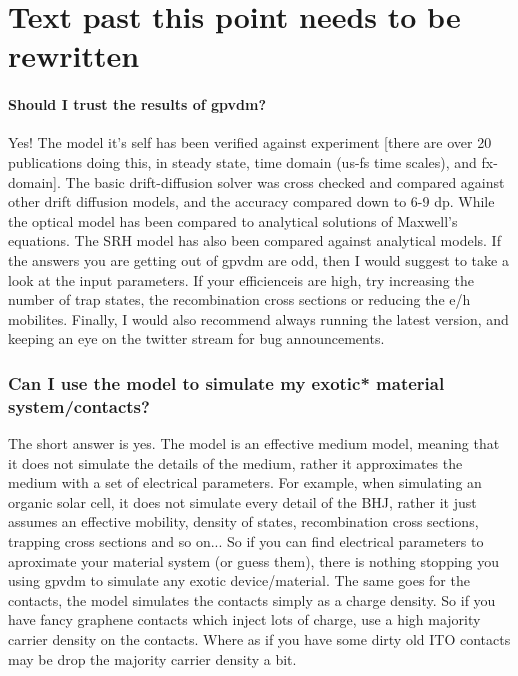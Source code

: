 
\chapter{Text past this point needs to be rewritten}


\subsubsection{Should I trust the results of gpvdm?}
Yes!  The model it's self has been verified against experiment [there are over 20 publications doing this, in steady state, time domain (us-fs time scales), and fx-domain]. The basic drift-diffusion solver was cross checked and compared against other drift diffusion models, and the accuracy compared down to 6-9 dp.  While the optical model has been compared to analytical solutions of Maxwell's equations.  The SRH model has also been compared against analytical models.  If the answers you are getting out of gpvdm are odd, then I would suggest to take a look at the input parameters.  If your efficienceis are high, try increasing the number of trap states, the recombination cross sections or reducing the e/h mobilites.  Finally, I would also recommend always running the latest version, and keeping an eye on the twitter stream for bug announcements.



\subsection{Can I use the model to simulate my exotic* material system/contacts?}
The short answer is yes.  The model is an effective medium model, meaning that it does not simulate the details of the medium, rather it approximates the medium with a set of electrical parameters.  For example, when simulating an organic solar cell, it does not simulate every detail of the BHJ, rather it just assumes an effective mobility, density of states, recombination cross sections, trapping cross sections and so on...  So if you can find electrical parameters to aproximate your material system (or guess them), there is nothing stopping you using gpvdm to simulate any exotic device/material.  The same goes for the contacts, the model simulates the contacts simply as a charge density. So if you have fancy graphene contacts which inject lots of charge, use a high majority carrier density on the contacts.  Where as if you have some dirty old ITO contacts may be drop the majority carrier density a bit.

